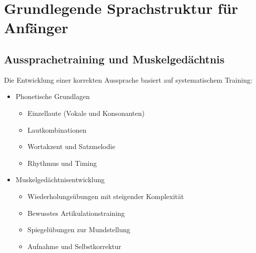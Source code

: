 \section{Grundlegende Sprachstruktur für Anfänger}

\subsection{Aussprachetraining und Muskelgedächtnis}
Die Entwicklung einer korrekten Aussprache basiert auf systematischem Training:
\begin{itemize}
    \item Phonetische Grundlagen
    \begin{itemize}
        \item Einzellaute (Vokale und Konsonanten)
        \item Lautkombinationen
        \item Wortakzent und Satzmelodie
        \item Rhythmus und Timing
    \end{itemize}
    
    \item Muskelgedächtnisentwicklung
    \begin{itemize}
        \item Wiederholungsübungen mit steigender Komplexität
        \item Bewusstes Artikulationstraining
        \item Spiegelübungen zur Mundstellung
        \item Aufnahme und Selbstkorrektur
    \end{itemize}
\end{itemize}

